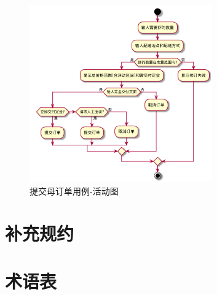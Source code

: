     \begin{figure}[htp]
        \centering
        \includegraphics[width=0.7\textwidth]{figure/usecase/uc_sub/uc_client_submit_request.png}
        \caption{提交母订单用例-活动图}
        \label{fig:put-order-uml}
    \end{figure}
    
    

\section{补充规约}

\section{术语表}


